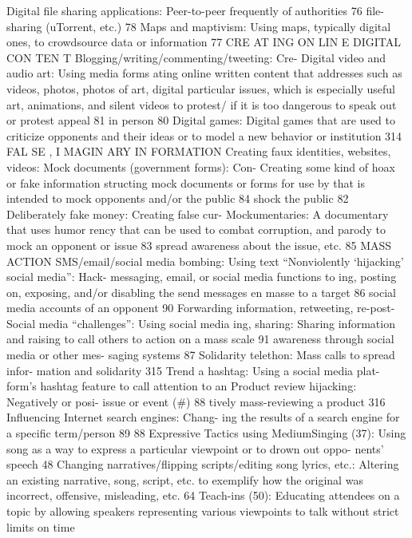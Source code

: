 \documentclass[twoside,a4paper,12pt,fleqn,openany]{extbook}
\begin{document}
 Digital file sharing applications: Peer-to-peer
frequently of authorities
 76
 file-sharing (uTorrent, etc.)
 78
Maps and maptivism: Using maps, typically digital
ones, to crowdsource data or information
 77
CRE AT ING ON LIN E DIGITAL CON TEN T
Blogging/writing/commenting/tweeting: Cre-
 Digital video and audio art: Using media forms
ating online written content that addresses
 such as videos, photos, photos of art, digital
particular issues, which is especially useful
 art, animations, and silent videos to protest/
if it is too dangerous to speak out or protest
 appeal
 81
in person
 80
Digital games: Digital games that are used to
criticize opponents and their ideas or to model
a new behavior or institution
 314
FAL SE , I MAGIN ARY IN FORMATION
Creating faux identities, websites, videos:
 Mock documents (government forms): Con-
Creating some kind of hoax or fake information
 structing mock documents or forms for use by
that is intended to mock opponents and/or
 the public
 84
shock the public
 82
Deliberately fake money: Creating false cur-
Mockumentaries: A documentary that uses humor
 rency that can be used to combat corruption,
and parody to mock an opponent or issue 83
 spread awareness about the issue, etc.
 85
MASS ACTION
SMS/email/social media bombing: Using text
 “Nonviolently ‘hijacking’ social media”: Hack-
messaging, email, or social media functions to
 ing, posting on, exposing, and/or disabling the
send messages en masse to a target
 86
 social media accounts of an opponent
 90
Forwarding information, retweeting, re-post-
 Social media “challenges”: Using social media
ing, sharing: Sharing information and raising
 to call others to action on a mass scale
 91
awareness through social media or other mes-
saging systems
 87
 Solidarity telethon: Mass calls to spread infor-
mation and solidarity
 315
Trend a hashtag: Using a social media plat-
form’s hashtag feature to call attention to an
 Product review hijacking: Negatively or posi-
issue or event (#)
 88
 tively mass-reviewing a product
 316
Influencing Internet search engines: Chang-
ing the results of a search engine for a specific
term/person
 89
88
Expressive Tactics using MediumSinging (37): Using song as a way to express
a particular viewpoint or to drown out oppo-
nents’ speech
 48
Changing narratives/flipping scripts/editing
song lyrics, etc.: Altering an existing narrative,
song, script, etc. to exemplify how the original
was incorrect, offensive, misleading, etc. 64
Teach-ins (50): Educating attendees on a topic
by allowing speakers representing various
viewpoints to talk without strict limits on time
\end{document}
